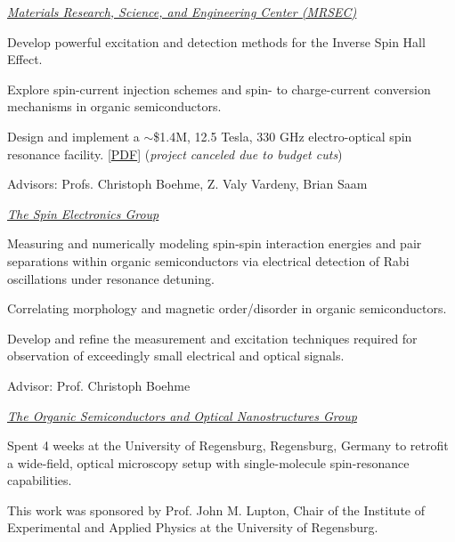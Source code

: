 \documentclass[11pt,letterpaper]{article}
\newenvironment{itemize*}
	{\begin{itemize}
	  	\setlength{\itemsep}{0pt}}
	{\end{itemize}}
\begin{document}
\begin{bibsection}
	\item \href{http://www.mrsec.utah.edu/}{\emph{Materials Research, Science, and Engineering Center (MRSEC)}}
		\begin{itemize*}
			\item Develop powerful excitation and detection methods for the Inverse Spin Hall Effect.
			\item Explore spin-current injection schemes and spin- to charge-current conversion mechanisms in organic semiconductors.
			\item Design and implement a $\sim$\$1.4M, 12.5 Tesla, 330 GHz electro-optical spin resonance facility. [\href{http://www.physics.utah.edu/~kippvs/papers/UtahMRSEC_HighField_NoQuotes.pdf}{PDF}] (\textit{project canceled due to budget cuts})
			\item Advisors: Profs. Christoph Boehme, Z. Valy Vardeny, Brian Saam
		\end{itemize*}

	\item \href{http://www.physics.utah.edu/~boehmelab/}{\emph{The Spin Electronics Group}}
		\begin{itemize*}
			\item Measuring and numerically modeling spin-spin interaction energies and pair separations within organic semiconductors via electrical detection of Rabi oscillations under resonance detuning.
			\item Correlating morphology and magnetic order/disorder in organic semiconductors.
			\item Develop and refine the measurement and excitation techniques required for observation of exceedingly small electrical and optical signals.
			\item Advisor: Prof. Christoph Boehme
		\end{itemize*}
	
	\item \href{http://www.physik.uni-regensburg.de/forschung/lupton/lupton/}{\emph{The Organic Semiconductors and Optical Nanostructures Group}}
		\begin{itemize*}
			\item Spent 4 weeks at the University of Regensburg, Regensburg, Germany to retrofit a wide-field, optical microscopy setup with single-molecule spin-resonance capabilities.
			\item This work was sponsored by Prof. John M. Lupton, Chair of the Institute of Experimental and Applied Physics at the University of Regensburg.
		\end{itemize*}
					
\end{bibsection}
\vspace{\baselineskip} %
\end{document}
